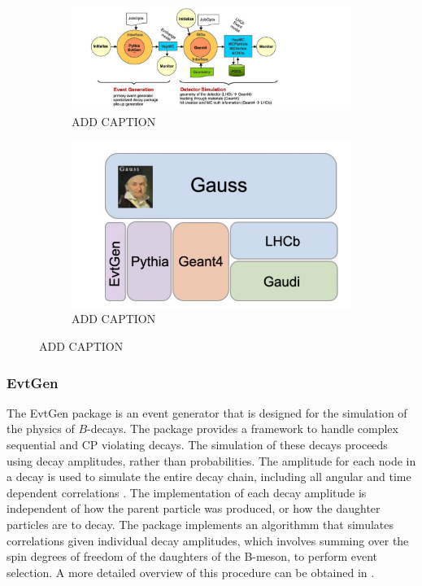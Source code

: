 \begin{figure}[H]
    \begin{subfigure}{0.4\textwidth}
    \includegraphics[scale = 0.5]{GaussSoftwareStructure.jpg}
    \caption{ADD CAPTION}
    \label{GaussSoftwareStructure}
    \end{subfigure}
    \hfill
    \begin{subfigure}{0.4\textwidth}
        \includegraphics[scale = 0.55]{GaussDependenices.jpg}
        \caption{ADD CAPTION}
        \label{GaussDependenices}
    \end{subfigure}
    \hfill
\end{figure}
\subsubsection{EvtGen}\label{EvtGen}
The EvtGen package is an event generator that is designed for the simulation of the physics of $B$-decays. The package provides a framework to handle complex sequential and CP violating decays. The simulation of these decays proceeds
using decay amplitudes, rather than probabilities. The amplitude for each node in a decay is used to simulate the entire decay chain, including all angular and time dependent correlations \cite{LANGE2001152}. The implementation of each decay amplitude is independent
of how the parent particle was produced, or how the daughter particles are to decay. The package implements an algorithmm that simulates correlations given individual decay amplitudes, which involves summing over the spin degrees of freedom of the daughters of the B-meson, to perform event selection. A more
detailed overview of this procedure can be obtained in \cite{LANGE2001152}.

